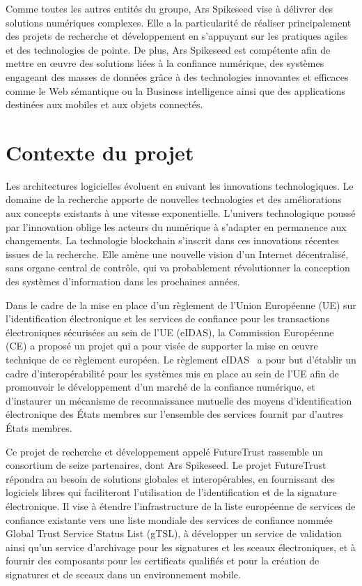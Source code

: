 \documentclass{tnreport}
\begin{document}
Comme toutes les autres entités du groupe, Ar{\texteta}s Spikeseed vise à délivrer des solutions numériques complexes. Elle a la particularité de réaliser principalement des projets de recherche et développement en s'appuyant sur les pratiques agiles et des technologies de pointe. 
De plus, Ar{\texteta}s Spikeseed est compétente afin de mettre en œuvre 
des solutions liées à la confiance numérique, 
des systèmes engageant des masses de données grâce à des technologies innovantes et efficaces comme le Web sémantique ou la Business intelligence ainsi que 
des applications destinées aux mobiles et aux objets connectés.

\section{Contexte du projet}

Les architectures logicielles évoluent en suivant les innovations technologiques. Le domaine de la recherche apporte de nouvelles technologies et des améliorations aux concepts existants à une vitesse exponentielle. L'univers technologique poussé par l'innovation oblige les acteurs du numérique à s'adapter en permanence aux changements. La technologie blockchain s'inscrit dans ces innovations récentes issues de la recherche. Elle amène une nouvelle vision d'un Internet décentralisé, sans organe central de contrôle, qui va probablement révolutionner la conception des systèmes d'information dans les prochaines années.

Dans le cadre de la mise en place d'un règlement de l'Union Européenne (UE) sur l'identification électronique et les services de confiance pour les transactions électroniques sécurisées au sein de l'UE (eIDAS), la Commission Européenne (CE) a proposé un projet qui a pour visée de supporter la mise en œuvre technique de ce règlement européen. 
Le règlement eIDAS~\cite{eIDAS} a pour but d'établir un cadre d’interopérabilité pour les systèmes mis en place au sein de l'UE afin de promouvoir le développement d’un marché de la confiance numérique, et d'instaurer un mécanisme de reconnaissance mutuelle des moyens d’identification électronique des États membres sur l’ensemble des services fournit par d'autres États membres.

Ce projet de recherche et développement appelé FutureTrust rassemble un consortium de seize partenaires, dont Ar{\texteta}s Spikeseed. 
Le projet FutureTrust répondra au besoin de solutions globales et interopérables, en fournissant des logiciels libres qui faciliteront l'utilisation de l'identification et de la signature électronique. 
Il vise à étendre l'infrastructure de la liste européenne de services de confiance existante vers une liste mondiale des services de confiance nommée Global Trust Service Status List (gTSL), à développer un service de validation ainsi qu'un service d'archivage pour les signatures et les sceaux électroniques, et à fournir des composants pour les certificats qualifiés et pour la création de signatures et de sceaux dans un environnement mobile.
\end{document}
